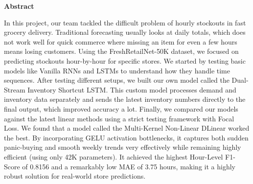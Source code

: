 \documentclass[12pt,phd,times]{pkmthesis}
\begin{document}
\setcounter{page}{1}   %
\onehalfspacing                              %
%

\thispagestyle{empty}

\thispagestyle{empty}

\clearpage
\thispagestyle{empty}
%
\newpage
\thispagestyle{empty}
\clearpage
\thispagestyle{empty}

\newpage
\thispagestyle{empty}
\clearpage

\thispagestyle{empty}

\thispagestyle{empty}
\clearpage

\thispagestyle{empty}
%
{\renewcommand{\baselinestretch}{1.5}
{%
\begin{center}
	{\bf{Abstract}}
\end{center}
{\em{\noindent 
In this project, our team tackled the difficult problem of hourly stockouts in fast grocery delivery. Traditional forecasting usually looks at daily totals, which does not work well for quick commerce where missing an item for even a few hours means losing customers. Using the FreshRetailNet-50K dataset, we focused on predicting stockouts hour-by-hour for specific stores. We started by testing basic models like Vanilla RNNs and LSTMs to understand how they handle time sequences. After testing different setups, we built our own model called the Dual-Stream Inventory Shortcut LSTM. This custom model processes demand and inventory data separately and sends the latest inventory numbers directly to the final output, which improved accuracy a lot. Finally, we compared our models against the latest linear methods using a strict testing framework with Focal Loss. We found that a model called the Multi-Kernel Non-Linear DLinear worked the best. By incorporating GELU activation bottlenecks, it captures both sudden panic-buying and smooth weekly trends very effectively while remaining highly efficient (using only 42K parameters). It achieved the highest Hour-Level F1-Score of 0.8156 and a remarkably low MAE of 3.75 hours, making it a highly robust solution for real-world store predictions.

	}}}}	
\thispagestyle{empty}
\clearpage
\end{document}
